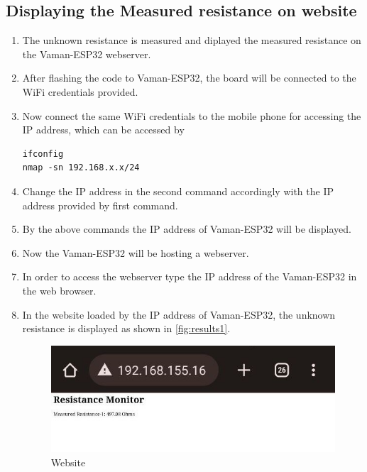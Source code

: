 \subsection{Displaying the Measured resistance on website}
\begin{enumerate}
\item The unknown resistance is measured and diplayed the measured resistance on
the Vaman-ESP32 webserver.
\item After flashing the code to Vaman-ESP32, the board will be connected to the
WiFi credentials provided.
\item Now connect the same WiFi credentials to the mobile phone for accessing 
the IP address, which can be accessed by 
\begin{lstlisting}
ifconfig
nmap -sn 192.168.x.x/24
\end{lstlisting}
\item Change the IP address in the second command accordingly with the IP 
address provided by first command.
\item By the above commands the IP address of Vaman-ESP32 will be displayed.
\item Now the Vaman-ESP32 will be hosting a webserver.
\item In order to access the webserver type the IP address of the Vaman-ESP32 in
the web browser.
\item In the website loaded by the IP address of Vaman-ESP32, the unknown 
resistance is displayed as shown in \autoref{fig:results1}.
\begin{figure}[!ht]
\centering
\includegraphics[width=\columnwidth]{vaman-esp32/spi-resistance/figs/result.jpg}
\caption{Website}
\label{fig:results1}
\end{figure}
\end{enumerate}
